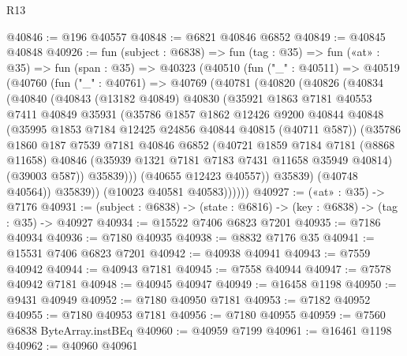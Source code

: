\begin{lexlean}{R13}
\begin{coremodule}
@40846 := @196 @40557
@40848 := @6821 @40846 @6852
@40849 := @40845 @40848
@40926 := fun (subject : @6838) =>
  fun (tag : @35) =>
  fun («at» : @35) =>
  fun (span : @35) =>
  @40323
    (@40510
      (fun ("_" : @40511) =>
      @40519
        (@40760
          (fun ("_" : @40761) =>
          @40769
            (@40781
              (@40820
                (@40826
                  (@40834
                    (@40840
                      (@40843
                        (@13182 @40849)
                        @40830
                        (@35921
                          @1863
                          @7181
                          @40553
                          @7411
                          @40849
                          @35931
                          (@35786
                            @1857
                            @1862
                            @12426
                            @9200
                            @40844
                            @40848
                            (@35995 @1853 @7184 @12425 @24856 @40844 @40815 (@40711 @587))
                            (@35786
                              @1860
                              @187
                              @7539
                              @7181
                              @40846
                              @6852
                              (@40721
                                @1859
                                @7184
                                @7181
                                (@8868 @11658)
                                @40846
                                (@35939 @1321 @7181 @7183 @7431 @11658 @35949 @40814)
                                (@39003 @587))
                              @35839)))
                        (@40655 @12423 @40557))
                      @35839)
                    (@40748 @40564))
                  @35839))
              (@10023 @40581 @40583))))))
@40927 := («at» : @35) -> @7176
@40931 := (subject : @6838) -> (state : @6816) -> (key : @6838) -> (tag : @35) -> @40927
@40934 := @15522 @7406 @6823 @7201
@40935 := @7186 @40934
@40936 := @7180 @40935
@40938 := @8832 @7176 @35
@40941 := @15531 @7406 @6823 @7201
@40942 := @40938 @40941
@40943 := @7559 @40942
@40944 := @40943 @7181
@40945 := @7558 @40944
@40947 := @7578 @40942 @7181
@40948 := @40945 @40947
@40949 := @16458 @1198
@40950 := @9431 @40949
@40952 := @7180 @40950 @7181
@40953 := @7182 @40952
@40955 := @7180 @40953 @7181
@40956 := @7180 @40955
@40959 := @7560 @6838 ByteArray.instBEq
@40960 := @40959 @7199
@40961 := @16461 @1198
@40962 := @40960 @40961

\end{coremodule}
\end{lexlean}

